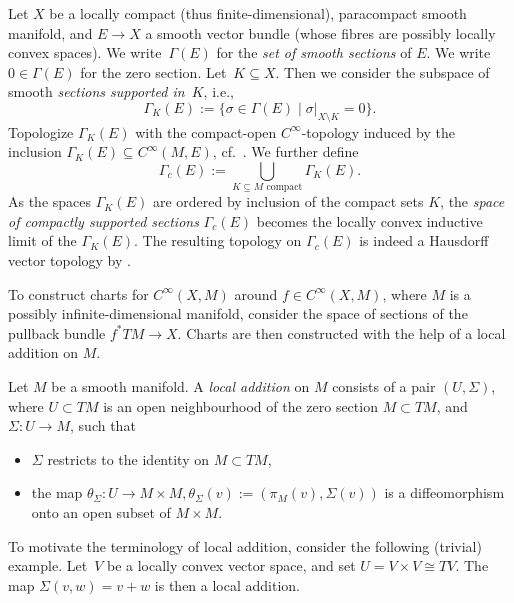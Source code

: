 Let $X$ be a locally compact (thus finite-dimensional), paracompact smooth manifold, and ${E \rightarrow X}$ a smooth vector bundle (whose fibres are possibly locally convex spaces).
We write~$\Gamma(E)$ for the \emph{set of smooth sections} of $E$.
We write $0 \in \Gamma(E)$ for the zero section.
Let~${K \subseteq X}$.
Then we consider the subspace of smooth \emph{sections supported in}~$K$, i.e.,
\begin{displaymath}
 \Gamma_{K}(E) := \bigl\{ \sigma \in \Gamma(E) \mid \sigma|_{X \setminus K} = 0 \bigr\}.
\end{displaymath}
Topologize $\Gamma_K(E)$ with the compact-open $C^{\infty}$-topology induced by the inclusion $\Gamma_K(E) \subseteq C^{\infty}(M,E)$, cf.\ \cite{HaS17}.
We further define
\begin{displaymath}
 \Gamma_c (E) := \bigcup_{K \subseteq M \text{ compact}} \Gamma_K (E).
\end{displaymath}
As the spaces $\Gamma_K(E)$ are ordered by inclusion of the compact sets $K$, the \emph{space of compactly supported sections} $\Gamma_c(E)$ becomes the locally convex inductive limit of the $\Gamma_K(E)$. The resulting topology on $\Gamma_c(E)$ is indeed a Hausdorff vector topology by \cite[Lemma F.19\,(c)]{glo04}.

To construct charts for $C^{\infty}(X,M)$ around $f \in C^{\infty}(X,M)$, where $M$ is a possibly infinite-dimensional manifold, consider the space of sections of the pullback bundle $f^{*}TM \rightarrow X$. Charts are then constructed with the help of a local addition on $M$.

\begin{Definition}%
 Let $M$ be a smooth manifold.
 A \emph{local addition} on $M$ consists of a pair $(U,\Sigma)$, where $U \subset TM$ is an open neighbourhood of the zero section $M \subset TM$, and $\Sigma \colon U \rightarrow M$,
 such that
 \begin{itemize}\itemsep=0pt
 \item $\Sigma$ restricts to the identity on $M \subset TM$,
 \item the map $\theta_\Sigma \colon U \rightarrow M \times M, \theta_\Sigma (v) := (\pi_M(v), \Sigma(v))$ is a diffeomorphism onto an open subset of $M \times M$.
 \end{itemize}
\end{Definition}

To motivate the terminology of local addition, consider the following (trivial) example. Let~$V$ be a locally convex vector space, and set $U = V \times V \cong TV$. The map $\Sigma (v,w) = v+w$ is then a local addition.



